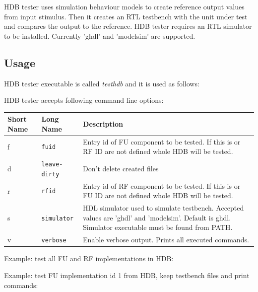 \documentclass[a4paper,twoside]{tceusermanual}
\begin{document}
HDB tester uses simulation behaviour models to create reference output values
from input stimulus. Then it creates an RTL testbench with the unit under test
and compares the output to the reference. HDB tester requires an RTL simulator
to be installed. Currently 'ghdl' and 'modelsim' are supported.

\subsection{Usage}

HDB tester executable is called \textit{testhdb} and it is used as follows:


HDB tester accepts following command line options:

\begin{center}
\begin{tabular}[htb]{@{}p{}@{}p{}%
                     @{}p{}}

\textbf{Short Name} &\textbf{Long Name} &\textbf{Description} \\
\hline

f & \verb|fuid| &
Entry id of FU component to be tested. If this is or RF ID are not defined
whole HDB will be tested. \\

d & \verb|leave-dirty| &
Don't delete created files \\

r & \verb|rfid| &
Entry id of RF component to be tested. If this is or FU ID are not defined
whole HDB will be tested. \\

s & \verb|simulator| &
HDL simulator used to simulate testbench. Accepted values are 'ghdl' and
'modelsim'. Default is ghdl. Simulator executable must be found from PATH. \\

v & \verb|verbose| &
Enable verbose output. Prints all executed commands. \\

\end{tabular}
\end{center}

Example: test all FU and RF implementations in HDB:


Example: test FU implementation id 1 from HDB, keep testbench files and print
commands:
\end{document}
